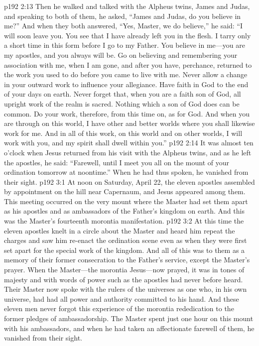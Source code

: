 \pc \vs p192 2:13 Then he walked and talked with the Alpheus twins, James and Judas, and speaking to both of them, he asked, \textcolor{ubdarkred}{“James and Judas, do you believe in me?”} And when they both answered, “Yes, Master, we do believe,” he said: \textcolor{ubdarkred}{“I will soon leave you. You see that I have already left you in the flesh. I tarry only a short time in this form before I go to my Father. You believe in me---you are my apostles, and you always will be. Go on believing and remembering your association with me, when I am gone, and after you have, perchance, returned to the work you used to do before you came to live with me. Never allow a change in your outward work to influence your allegiance. Have faith in God to the end of your days on earth. Never forget that, when you are a faith son of God, all upright work of the realm is sacred. Nothing which a son of God does can be common. Do your work, therefore, from this time on, as for God. And when you are through on this world, I have other and better worlds where you shall likewise work for me. And in all of this work, on this world and on other worlds, I will work with you, and my spirit shall dwell within you.”}
\pc \vs p192 2:14 It was almost ten o’clock when Jesus returned from his visit with the Alpheus twins, and as he left the apostles, he said: \textcolor{ubdarkred}{“Farewell, until I meet you all on the mount of your ordination tomorrow at noontime.”} When he had thus spoken, he vanished from their sight.
\vs p192 3:1 At noon on Saturday, April 22, the eleven apostles assembled by appointment on the hill near Capernaum, and Jesus appeared among them. This meeting occurred on the very mount where the Master had set them apart as his apostles and as ambassadors of the Father’s kingdom on earth. And this was the Master’s fourteenth morontia manifestation.
\vs p192 3:2 At this time the eleven apostles knelt in a circle about the Master and heard him repeat the charges and saw him re\hyp{}enact the ordination scene even as when they were first set apart for the special work of the kingdom. And all of this was to them as a memory of their former consecration to the Father’s service, except the Master’s prayer. When the Master---the morontia Jesus---now prayed, it was in tones of majesty and with words of power such as the apostles had never before heard. Their Master now spoke with the rulers of the universes as one who, in his own universe, had had all power and authority committed to his hand. And these eleven men never forgot this experience of the morontia rededication to the former pledges of ambassadorship. The Master spent just one hour on this mount with his ambassadors, and when he had taken an affectionate farewell of them, he vanished from their sight.\plusone
